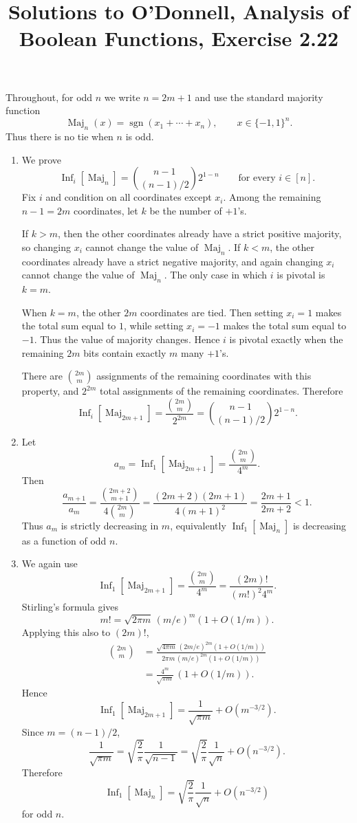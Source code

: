 \documentclass[11pt]{article}
\title{Solutions to O'Donnell, Analysis of Boolean Functions, Exercise 2.22}
\author{}
\date{}
\newcommand{\Inf}{\operatorname{Inf}}
\newcommand{\Maj}{\operatorname{Maj}}
\begin{document}
\maketitle

Throughout, for odd $n$ we write $n=2m+1$ and use the
standard majority function
\[
  \Maj_n(x)=\operatorname{sgn}(x_1+\cdots+x_n),
  \qquad x\in\{-1,1\}^n.
\]
Thus there is no tie when $n$ is odd.

\begin{enumerate}[label=\textbf{(\alph*)}]
\item
We prove
\[
  \Inf_i[\Maj_n]
    =
  \binom{n-1}{(n-1)/2}2^{1-n}
  \qquad \text{for every } i\in[n].
\]
Fix $i$ and condition on all coordinates except $x_i$.  Among the
remaining $n-1=2m$ coordinates, let $k$ be the number of $+1$'s.

If $k>m$, then the other coordinates already have a strict positive
majority, so changing $x_i$ cannot change the value of $\Maj_n$.  If
$k<m$, the other coordinates already have a strict negative majority,
and again changing $x_i$ cannot change the value of $\Maj_n$.  The only
case in which $i$ is pivotal is $k=m$.

When $k=m$, the other $2m$ coordinates are tied.  Then setting $x_i=1$
makes the total sum equal to $1$, while setting $x_i=-1$ makes the total
sum equal to $-1$.  Thus the value of majority changes.  Hence $i$ is
pivotal exactly when the remaining $2m$ bits contain exactly $m$ many
$+1$'s.

There are $\binom{2m}{m}$ assignments of the remaining coordinates with
this property, and $2^{2m}$ total assignments of the remaining
coordinates.  Therefore
\[
  \Inf_i[\Maj_{2m+1}]
    =
  \frac{\binom{2m}{m}}{2^{2m}}
    =
  \binom{n-1}{(n-1)/2}2^{1-n}.
\]

\item
Let
\[
  a_m=\Inf_1[\Maj_{2m+1}]
      =\frac{\binom{2m}{m}}{4^m}.
\]
Then
\[
  \frac{a_{m+1}}{a_m}
   =
  \frac{\binom{2m+2}{m+1}}{4\binom{2m}{m}}
   =
  \frac{(2m+2)(2m+1)}{4(m+1)^2}
   =
  \frac{2m+1}{2m+2}
   <1.
\]
Thus $a_m$ is strictly decreasing in $m$, equivalently
$\Inf_1[\Maj_n]$ is decreasing as a function of odd $n$.

\item
We again use
\[
  \Inf_1[\Maj_{2m+1}]
    =
  \frac{\binom{2m}{m}}{4^m}
    =
  \frac{(2m)!}{(m!)^2 4^m}.
\]
Stirling's formula gives
\[
  m! = \sqrt{2\pi m}\,(m/e)^m(1+O(1/m)).
\]
Applying this also to $(2m)!$,
\[
\begin{aligned}
  \binom{2m}{m}
  &=
  \frac{\sqrt{4\pi m}\,(2m/e)^{2m}(1+O(1/m))}
       {2\pi m\,(m/e)^{2m}(1+O(1/m))}  \\
  &=
  \frac{4^m}{\sqrt{\pi m}}\,(1+O(1/m)).
\end{aligned}
\]
Hence
\[
  \Inf_1[\Maj_{2m+1}]
    =
  \frac{1}{\sqrt{\pi m}}+O(m^{-3/2}).
\]
Since $m=(n-1)/2$,
\[
  \frac{1}{\sqrt{\pi m}}
    =
  \sqrt{\frac{2}{\pi}}\frac{1}{\sqrt{n-1}}
    =
  \sqrt{\frac{2}{\pi}}\frac{1}{\sqrt n}
      +O(n^{-3/2}).
\]
Therefore
\[
  \Inf_1[\Maj_n]
    =
  \sqrt{\frac{2}{\pi}}\frac{1}{\sqrt n}
    +O(n^{-3/2})
\]
for odd $n$.


\end{enumerate}
\end{document}
